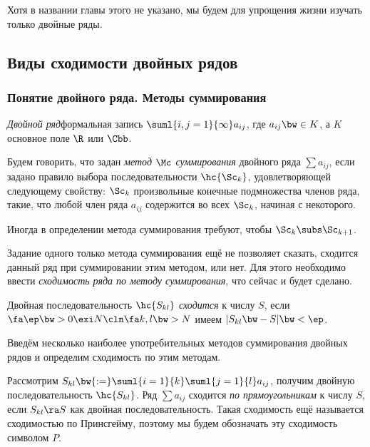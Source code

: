 \documentclass[a4paper]{article}
\begin{document}
Хотя в названии главы этого не указано, мы будем для упрощения жизни изучать только двойные ряды.

\subsection{Виды сходимости двойных рядов}

\subsubsection{Понятие двойного ряда. Методы суммирования}

\begin{df}
\emph{Двойной ряд}\т формальная запись $\suml{i,j=1}{\infty}a_{ij}$, где $a_{ij} \bw\in K$, а $K$\т
основное поле $\R$ или $\Cbb$.
\end{df}
\begin{df}
Будем говорить, что задан \emph{метод $\Mc$ суммирования} двойного ряда $\sum a_{ij}$, если задано
правило выбора последовательности $\hc{\Sc_k}$, удовлетворяющей следующему свойству: $\Sc_k$\т
произвольные конечные подмножества членов ряда, такие, что любой член ряда $a_{ij}$
содержится во всех $\Sc_k$, начиная с некоторого.
\end{df}

\begin{note}
Иногда в определении метода суммирования требуют, чтобы $\Sc_k \subs \Sc_{k+1}$.
\end{note}

\begin{note}
Задание одного только метода суммирования ещё не позволяет сказать, сходится данный ряд при
суммировании этим методом, или нет. Для этого необходимо ввести \emph{сходимость ряда по
методу суммирования}, что сейчас и будет сделано.
\end{note}

\begin{df}
Двойная последовательность $\hc{S_{kl}}$ \emph{сходится} к числу $S$, если
$\fa \ep \bw> 0 \exi N\cln \fa k, l \bw> N$ имеем $|S_{kl} \bw- S| \bw< \ep$.
\end{df}

Введём несколько наиболее употребительных методов суммирования двойных рядов и определим
сходимость по этим методам.

\begin{df}
Рассмотрим $S_{kl} \bw{:=} \suml{i=1}{k}\suml{j=1}{l} a_{ij}$, получим двойную последовательность $\hc{S_{kl}}$.
Ряд $\sum a_{ij}$ сходится \emph{по прямоугольникам} к числу $S$, если $S_{kl} \ra S$ как двойная последовательность.
Такая сходимость ещё называется сходимостью по Принсгейму, поэтому мы будем обозначать эту сходимость символом $P$.
\end{df}
\end{document}
